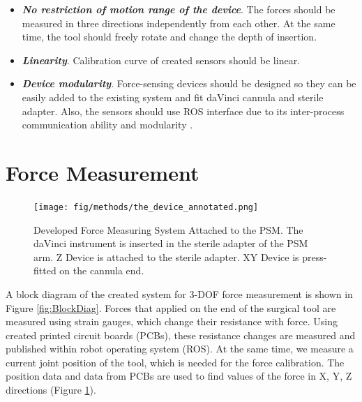 \begin{itemize}
    \item \textbf{\textit{No restriction of motion range of the device}}. The forces should be measured in three directions independently from each other. At the same time, the tool should freely rotate and change the depth of insertion.    
    
    \item \textbf{\textit{Linearity}}. Calibration curve of created sensors should be linear.

    \item \textbf{\textit{Device modularity}}. Force-sensing devices should be designed so they can be easily added to the existing system and fit daVinci cannula and sterile adapter. Also, the sensors should use ROS interface due to its inter-process communication ability and modularity \cite{_ros}.
\end{itemize}


\section{Force Measurement}
\label{sec:sysArch}

\begin{figure}[h]
	\begin{center}
	\texttt{[image: fig/methods/the\_device\_annotated.png]}
	\end{center}
	\vspace{-4mm}
	\caption[Developed Force Measuring System Attached to the PSM]
	{Developed Force Measuring System Attached to the PSM. The daVinci instrument is inserted in the sterile adapter of the PSM arm. Z Device is attached to the sterile adapter. XY Device is press-fitted on the cannula end.}
	\label{fig:PSM_with_FF}
	\vspace{-2mm}
\end{figure}

A block diagram of the created system for 3-DOF force measurement is shown in Figure \ref{fig:BlockDiag}. Forces that applied on the end of the surgical tool are measured using strain gauges, which change their resistance with force. Using created printed circuit boards (PCBs), these resistance changes are measured and published within robot operating system (ROS). At the same time, we measure a current joint position of the tool, which is needed for the force calibration. The position data and data from PCBs are used to find values of the force in X, Y, Z directions (Figure \ref{fig:PSM_with_FF}).

